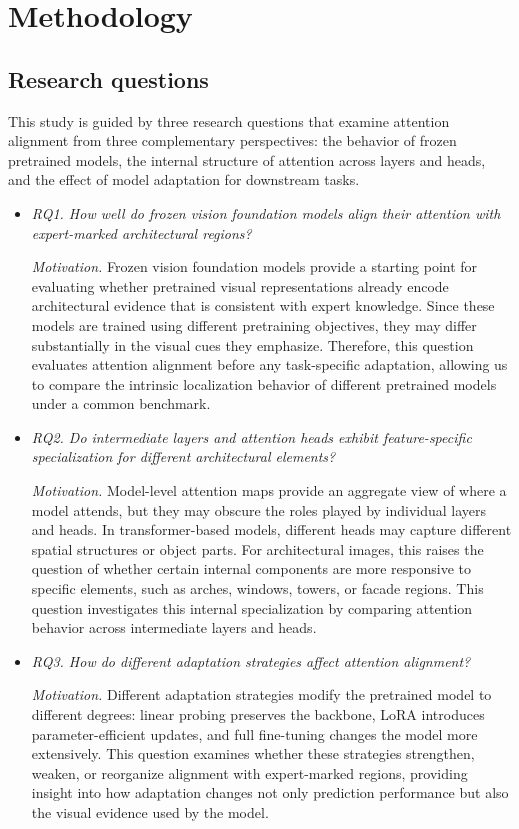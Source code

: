 \documentclass[lineno,pdflatex,sn-mathphys-num]{sn-jnl}%
\theoremstyle{thmstyleone}%
\theoremstyle{thmstyletwo}%
\theoremstyle{thmstylethree}%
\begin{document}
\section{Methodology} \label{section proposed approach}

\subsection{Research questions}

This study is guided by three research questions that examine attention alignment from three complementary perspectives: the behavior of frozen pretrained models, the internal structure of attention across layers and heads, and the effect of model adaptation for downstream tasks.

\begin{itemize}
\item \textit{RQ1. How well do frozen vision foundation models align their attention with expert-marked architectural regions?}

\textit{Motivation.} Frozen vision foundation models provide a starting point for evaluating whether pretrained visual representations already encode architectural evidence that is consistent with expert knowledge. Since these models are trained using different pretraining objectives, they may differ substantially in the visual cues they emphasize. Therefore, this question evaluates attention alignment before any task-specific adaptation, allowing us to compare the intrinsic localization behavior of different pretrained models under a common benchmark.

\item \textit{RQ2. Do intermediate layers and attention heads exhibit feature-specific specialization for different architectural elements?}

\textit{Motivation.} Model-level attention maps provide an aggregate view of where a model attends, but they may obscure the roles played by individual layers and heads. In transformer-based models, different heads may capture different spatial structures or object parts. For architectural images, this raises the question of whether certain internal components are more responsive to specific elements, such as arches, windows, towers, or facade regions. This question investigates this internal specialization by comparing attention behavior across intermediate layers and heads.
\item \textit{RQ3. How do different adaptation strategies affect attention alignment?}

\textit{Motivation.} Different adaptation strategies modify the pretrained model to different degrees: linear probing preserves the backbone, LoRA introduces parameter-efficient updates, and full fine-tuning changes the model more extensively. This question examines whether these strategies strengthen, weaken, or reorganize alignment with expert-marked regions, providing insight into how adaptation changes not only prediction performance but also the visual evidence used by the model.
\end{itemize}
\end{document}
